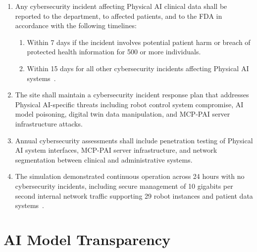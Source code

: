 \begin{enumerate}[label=(\alph*)]
\item Any cybersecurity incident affecting Physical AI clinical data shall be
  reported to the department, to affected patients, and to the FDA in
  accordance with the following timelines:
  \begin{enumerate}[label=(\arabic*)]
  \item Within 7 days if the incident involves potential patient harm or
    breach of protected health information for 500 or more individuals.
  \item Within 15 days for all other cybersecurity incidents affecting Physical
    AI systems~\cite{cfr312adapt}.
  \end{enumerate}

\item The site shall maintain a cybersecurity incident response plan that
  addresses Physical AI-specific threats including robot control system
  compromise, AI model poisoning, digital twin data manipulation, and
  MCP-PAI server infrastructure attacks.

\item Annual cybersecurity assessments shall include penetration testing of
  Physical AI system interfaces, MCP-PAI server infrastructure, and network
  segmentation between clinical and administrative systems.

\item The simulation demonstrated continuous operation across 24 hours with no
  cybersecurity incidents, including secure management of 10 gigabits per
  second internal network traffic supporting 29 robot instances and patient
  data systems~\cite{sitespec2026}.
\end{enumerate}

\section{AI Model Transparency}

